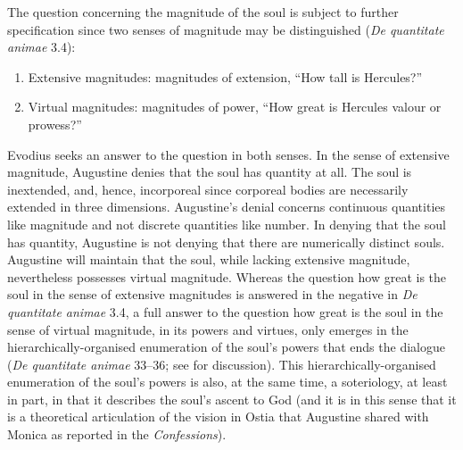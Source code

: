 \documentclass[12pt]{article}
\begin{document}
The question concerning the magnitude of the soul is subject to further specification since two senses of magnitude may be distinguished (\emph{De quantitate animae} 3.4):
\begin{enumerate}
	\item Extensive magnitudes: magnitudes of extension, “How tall is Hercules?”
	\item Virtual magnitudes: magnitudes of power, “How great is Hercules valour or prowess?”
\end{enumerate}
Evodius seeks an answer to the question in both senses. In the sense of extensive magnitude, Augustine denies that the soul has quantity at all. The soul is inextended, and, hence, incorporeal since corporeal bodies are necessarily extended in three dimensions. Augustine's denial concerns continuous quantities like magnitude and not discrete quantities like number. In denying that the soul has quantity, Augustine is not denying that there are numerically distinct souls. Augustine will maintain that the soul, while lacking extensive magnitude, nevertheless possesses virtual magnitude. Whereas the question how great is the soul in the sense of extensive magnitudes is answered in the negative in \emph{De quantitate animae} 3.4, a full answer to the question how great is the soul in the sense of virtual magnitude, in its powers and virtues, only emerges in the hierarchically-organised enumeration of the soul’s powers that ends the dialogue (\emph{De quantitate animae} 33–36; see \citealt{Brittain2003-BRICA-2} for discussion). This hierarchically-organised enumeration of the soul’s powers is also, at the same time, a soteriology, at least in part, in that it describes the soul’s ascent to God (and it is in this sense that it is a theoretical articulation of the vision in Ostia that Augustine shared with Monica as reported in the \emph{Confessions}).
\end{document}
